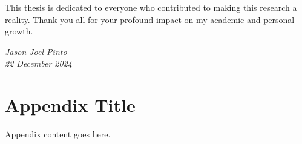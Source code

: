 \documentclass[12pt,onecolumn]{report}
\begin{document}
This thesis is dedicated to everyone who contributed to making this research a reality. Thank you all for your profound impact on my academic and personal growth.


\begin{flushright}
\textit{Jason Joel Pinto} \\
\textit{22 December 2024}
\end{flushright}

\appendix
\chapter{Appendix Title}
Appendix content goes here.

\cleardoublepage
\printbibliography
\end{document}
